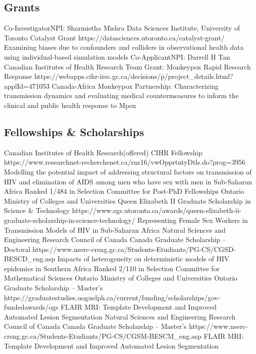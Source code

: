 \subsection{Grants}
  {Co-Investigator}{NPI: Sharmistha Mishra }
  {Data Sciences Institute, University of Toronto}
  {Catalyst Grant}
  {https://datasciences.utoronto.ca/catalyst-grant/}
  {Examining biases due to confounders and colliders in observational health data using individual-based simulation models}
  {Co-Applicant}{NPI: Darrell H Tan }
  {Canadian Institutes of Health Research}
  {Team Grant: Monkeypox Rapid Research Response}
  {https://webapps.cihr-irsc.gc.ca/decisions/p/project_details.html?applId=471053}
  {Canada-Africa Monkeypox Partnership: Characterizing transmission dynamics and evaluating medical countermeasures to inform the clinical and public health response to Mpox}
\subsection{Fellowships \& Scholarships}
  {Canadian Institutes of Health Research}{(offered)}
  {CIHR Fellowship}
  {https://www.researchnet-recherchenet.ca/rnr16/vwOpprtntyDtls.do?prog=3956}
  {Modelling the potential impact of addressing structural factors on transmission of HIV and elimination of AIDS among men who have sex with men in Sub-Saharan Africa}
  {Ranked 1/484 in Selection Committee for Post-PhD Fellowships}
  {Ontario Ministry of Colleges and Universities}{}
  {Queen Elizabeth II Graduate Scholarship in Science \& Technology}
  {https://www.sgs.utoronto.ca/awards/queen-elizabeth-ii-graduate-scholarship-in-science-technology/}
  {Representing Female Sex Workers in Transmission Models of HIV in Sub-Saharan Africa}
  {}
  {Natural Sciences and Engineering Research Council of Canada}{}
  {Canada Graduate Scholarship -- Doctoral}
  {https://www.nserc-crsng.gc.ca/Students-Etudiants/PG-CS/CGSD-BESCD_eng.asp}
  {Impacts of heterogeneity on deterministic models of HIV epidemics in Southern Africa}
  {Ranked 2/110 in Selection Committee for Mathematical Sciences}
  {Ontario Ministry of Colleges and Universities}{}
  {Ontario Graduate Scholarship -- Master's}
  {https://graduatestudies.uoguelph.ca/current/funding/scholarships/gov-fundedawards/ogs}
  {FLAIR MRI: Template Development and Improved Automated Lesion Segmentation}
  {}
  {Natural Sciences and Engineering Research Council of Canada}{}
  {Canada Graduate Scholarship -- Master's}
  {https://www.nserc-crsng.gc.ca/Students-Etudiants/PG-CS/CGSM-BESCM_eng.asp}
  {FLAIR MRI: Template Development and Improved Automated Lesion Segmentation}
  {}

